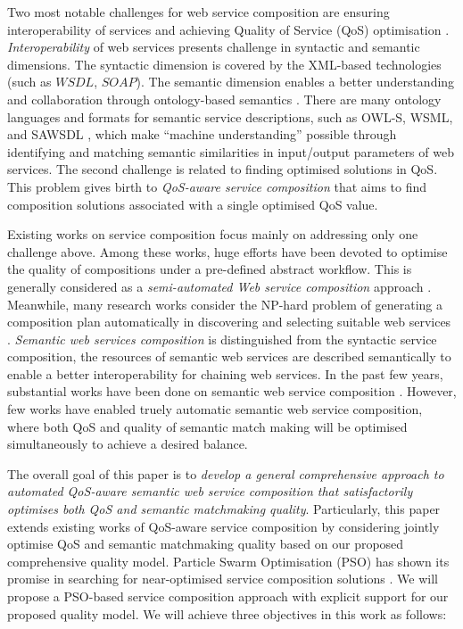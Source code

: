 \documentclass{llncs}
\begin{document}
Two most notable challenges for web service composition are ensuring interoperability of services and achieving Quality of Service (QoS) optimisation \cite{fensel2011semantic}. \textit{Interoperability} of web services presents challenge in syntactic and semantic dimensions. The syntactic dimension is covered by the XML-based technologies (such as $WSDL$, $SOAP$). The semantic dimension enables a better understanding and collaboration through ontology-based semantics \cite{o2005review}. There are many ontology languages and formats for semantic service descriptions, such as OWL-S, WSML, and SAWSDL \cite{petrie2016web}, which make ``machine understanding'' possible through identifying and matching semantic similarities in input/output parameters of web services. The second challenge is related to finding optimised solutions in QoS. This problem gives birth to \textit{QoS-aware service composition} that aims to find composition solutions associated with a single optimised QoS value.

Existing works on service composition focus mainly on addressing only one challenge above. Among these works, huge efforts have been devoted to optimise the quality of compositions under a pre-defined abstract workflow. This is generally considered as a \textit{semi-automated Web service composition} approach \cite{bahadori2009optimal,parejo2008qos}. Meanwhile, many research works consider the NP-hard problem of generating a composition plan automatically in discovering and selecting suitable web services \cite{moghaddam2014service}. \textit{Semantic web services composition} is distinguished from the syntactic service composition, the resources of semantic web services are described semantically to enable a better interoperability for chaining web services. In the past few years, substantial works have been done on semantic web service composition \cite{bansal2016generalized,boustil2014semantic,mier2015integrated}. However, few works have enabled truely automatic semantic web service composition, where both QoS and quality of semantic match making will be optimised simultaneously to achieve a desired balance.

The overall goal of this paper is to \textit{develop a general comprehensive approach to automated QoS-aware semantic web service composition that satisfactorily optimises both QoS and semantic matchmaking quality}. Particularly, this paper extends existing works of QoS-aware service composition by considering jointly optimise QoS and semantic matchmaking quality based on our proposed comprehensive quality model. Particle Swarm Optimisation (PSO) has shown its promise in searching for near-optimised service composition solutions \cite{da2016particle}. We will propose a PSO-based service composition approach with explicit support for our proposed quality model. We will achieve three objectives in this work as follows:
\end{document}

